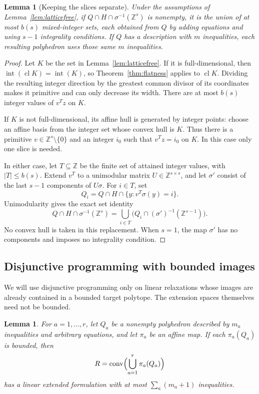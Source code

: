 \documentclass[11pt]{article}
\newtheorem{lemma}[theorem]{Lemma}
\theoremstyle{definition}
\DeclareMathOperator{\conv}{conv}
\DeclareMathOperator{\intr}{int}
\DeclareMathOperator{\cl}{cl}
\newcommand{\Z}{\mathbb Z}
\begin{document}
\begin{lemma}[Keeping the slices separate]\label{lem:slicing}
Under the assumptions of Lemma~\ref{lem:latticefree}, if
$Q\cap H\cap\sigma^{-1}(\Z^s)$ is nonempty, it is the union of at most
$b(s)$ mixed-integer sets, each obtained from $Q$ by adding equations and
using $s-1$ integrality conditions. If $Q$ has a description with $m$
inequalities, each resulting polyhedron uses those same $m$ inequalities.
\end{lemma}

\begin{proof}
Let $K$ be the set in Lemma~\ref{lem:latticefree}. If it is full-dimensional,
then $\intr(\cl K)=\intr(K)$, so Theorem~\ref{thm:flatness} applies to
$\cl K$. Dividing the resulting integer direction by the greatest common
divisor of its coordinates makes it primitive and can only decrease its width.
There are at most $b(s)$ integer values of $v^Tz$ on $K$.

If $K$ is not full-dimensional, its affine hull is generated by integer points:
choose an affine basis from the integer set whose convex hull is $K$.
Thus there is a primitive $v\in\Z^s\setminus\{0\}$ and an integer $i_0$
such that $v^Tz=i_0$ on $K$. In this case only one slice is needed.

In either case, let $T\subseteq\Z$ be the finite set of attained integer
values, with $|T|\leq b(s)$. Extend $v^T$ to a unimodular matrix
$U\in\Z^{s\times s}$, and let $\sigma'$ consist of the last $s-1$
components of $U\sigma$. For $i\in T$, set
\[
 Q_i=Q\cap H\cap\{y:v^T\sigma(y)=i\}.
\]
Unimodularity gives the exact set identity
\begin{equation}\label{eq:exactunion}
 Q\cap H\cap\sigma^{-1}(\Z^s)
 =\bigcup_{i\in T}\bigl(Q_i\cap(\sigma')^{-1}(\Z^{s-1})\bigr).
\end{equation}
No convex hull is taken in this replacement. When $s=1$, the map $\sigma'$
has no components and imposes no integrality condition.
\end{proof}

\subsection{Disjunctive programming with bounded images}
We will use disjunctive programming only on linear relaxations whose images
are already contained in a bounded target polytope. The extension spaces
themselves need not be bounded.

\begin{lemma}\label{lem:disjunction}
For $a=1,\ldots,r$, let $Q_a$ be a nonempty polyhedron described by $m_a$
inequalities and arbitrary equations, and let $\pi_a$ be an affine map.
If each $\pi_a(Q_a)$ is bounded, then
\[
 R=\conv\Bigl(\bigcup_{a=1}^r\pi_a(Q_a)\Bigr)
\]
has a linear extended formulation with at most $\sum_a(m_a+1)$ inequalities.
\end{lemma}
\end{document}
